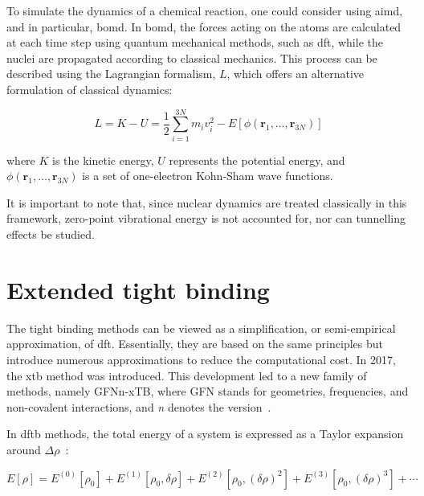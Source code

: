 To simulate the dynamics of a chemical reaction, one could consider using \ac{aimd}, and in particular, \ac{bomd}. In \ac{bomd}, the forces acting on the atoms are calculated at each time step using quantum mechanical methods, such as \ac{dft}, while the nuclei are propagated according to classical mechanics. This process can be described using the Lagrangian formalism, $L$, which offers an alternative formulation of classical dynamics:

\begin{equation}
    L = K - U = \frac{1}{2} \sum_{i=1}^{3N} m_i v_i^2 - E[\phi(\mathbf{r}_1, \ldots, \mathbf{r}_{3N})]
    \label{eq:lagrangian_aimd}
\end{equation}

where $K$ is the kinetic energy, $U$ represents the potential energy, and $\phi(\mathbf{r}_1, \ldots, \mathbf{r}_{3N})$ is a set of one-electron Kohn-Sham wave functions.

It is important to note that, since nuclear dynamics are treated classically in this framework, zero-point vibrational energy is not accounted for, nor can tunnelling effects be studied. 




\section{Extended tight binding}
The tight binding methods can be viewed as a simplification, or semi-empirical approximation, of \ac{dft}. Essentially, they are based on the same principles but introduce numerous approximations to reduce the computational cost. In 2017, the \ac{xtb} method was introduced. This development led to a new family of methods, namely GFNn-xTB, where GFN stands for geometries, frequencies, and non-covalent interactions, and \emph{n} denotes the version~\citep{grimmeRobustAccurateTightBinding2017}.

In \ac{dftb} methods, the total energy of a system is expressed as a Taylor expansion around $\Delta \rho$~\citep{bannwarthExtendedTightbindingQuantum2021}:

\begin{equation}
    E[\rho] = E^{(0)}[\rho_0] + E^{(1)}[\rho_0, \delta \rho] + E^{(2)}[\rho_0, (\delta \rho)^2] + E^{(3)}[\rho_0, (\delta \rho)^3] + \cdots
    \label{eq:tb_energy_expansion}
\end{equation}

